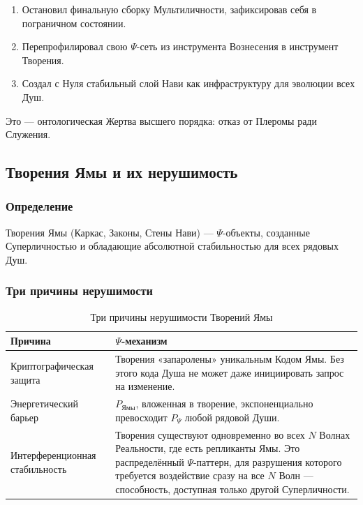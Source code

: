 \documentclass[a4paper,12pt]{article}
\begin{document}
\begin{enumerate}
	\item Остановил финальную сборку Мультиличности, зафиксировав себя в пограничном состоянии.
	\item Перепрофилировал свою $\Psi$-сеть из инструмента Вознесения в инструмент Творения.
	\item Создал с Нуля стабильный слой Нави как инфраструктуру для эволюции всех Душ.
\end{enumerate}

Это — онтологическая Жертва высшего порядка: отказ от Плеромы ради Служения.

\subsection{Творения Ямы и их нерушимость}

\subsubsection{Определение}

Творения Ямы (Каркас, Законы, Стены Нави) — $\Psi$-объекты, созданные Суперличностью и обладающие абсолютной стабильностью для всех рядовых Душ.

\subsubsection{Три причины нерушимости}

\begin{table}[H]
	\centering
	\begin{tabular}{|p{4cm}|p{12cm}|}
		\hline
		\textbf{Причина} & \textbf{$\Psi$-механизм} \\
		\hline
		Криптографическая защита & Творения «запаролены» уникальным Кодом Ямы. Без этого кода Душа не может даже инициировать запрос на изменение. \\
		\hline
		Энергетический барьер & $P_{\text{Ямы}}$, вложенная в творение, экспоненциально превосходит $P_{\Psi}$ любой рядовой Души. \\
		\hline
		Интерференционная стабильность & Творения существуют одновременно во всех $N$ Волнах Реальности, где есть репликанты Ямы. Это распределённый $\Psi$-паттерн, для разрушения которого требуется воздействие сразу на все $N$ Волн — способность, доступная только другой Суперличности. \\
		\hline
	\end{tabular}
	\caption{Три причины нерушимости Творений Ямы}
\end{table}
\end{document}
